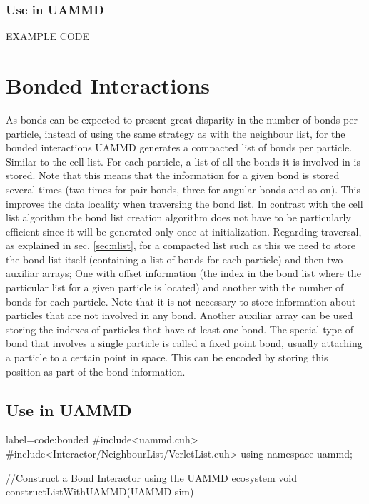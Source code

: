 \documentclass[ twoside,openright,titlepage,numbers=noenddot,%
headinclude,footinclude,cleardoublepage=empty,abstract=on,
BCOR=5mm,paper=a4,fontsize=11pt, dvipsnames
]{scrreprt}
\newcommand{\uammd}{\gls{UAMMD}\xspace}
\begin{document}
\subsection*{Use in UAMMD}

EXAMPLE CODE

\chapter{Bonded Interactions}\label{sec:bonded}

As bonds can be expected to present great disparity in the number of bonds per particle, instead of using the same strategy as with the neighbour list, for the bonded interactions \uammd generates a compacted list of bonds per particle. Similar to the cell list.
For each particle, a list of all the bonds it is involved in is stored. Note that this means that the information for a given bond is stored several times (two times for pair bonds, three for angular bonds and so on).
This improves the data locality when traversing the bond list.
In contrast with the cell list algorithm the bond list creation algorithm does not have to be particularly efficient since it will be generated only once at initialization.
Regarding traversal, as explained in sec. \ref{sec:nlist}, for a compacted list such as this we need to store the bond list itself (containing a list of bonds for each particle) and then two auxiliar arrays; One with offset information (the index in the bond list where the particular list for a given particle is located) and another with the number of bonds for each particle.
Note that it is not necessary to store information about particles that are not involved in any bond. Another auxiliar array can be used storing the indexes of particles that have at least one bond.
The special type of bond that involves a single particle is called a fixed point bond, usually attaching a particle to a certain point in space. This can be encoded by storing this position as part of the bond information.


\section*{Use in UAMMD}

\begin{code2}
  {label=code:bonded}
#include<uammd.cuh>
#include<Interactor/NeighbourList/VerletList.cuh>
using namespace uammd;

//Construct a Bond Interactor using the UAMMD ecosystem
void constructListWithUAMMD(UAMMD sim){

}
\end{code2}
\end{document}
